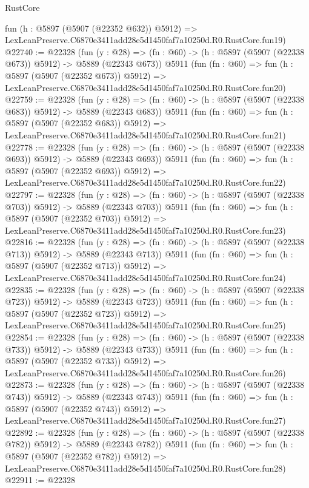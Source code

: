 \begin{lexlean}{RustCore}
\begin{coremodule}
    fun (h : @5897 (@5907 (@22352 @632)) @5912) =>
    LexLeanPreserve.C6870e3411add28e5d1450faf7a10250d.R0.RustCore.fun19)
@22740 := @22328
    (fun (y : @28) => (fn : @60) -> (h : @5897 (@5907 (@22338 @673)) @5912) -> @5889 (@22343 @673))
    @5911
    (fun (fn : @60) =>
    fun (h : @5897 (@5907 (@22352 @673)) @5912) =>
    LexLeanPreserve.C6870e3411add28e5d1450faf7a10250d.R0.RustCore.fun20)
@22759 := @22328
    (fun (y : @28) => (fn : @60) -> (h : @5897 (@5907 (@22338 @683)) @5912) -> @5889 (@22343 @683))
    @5911
    (fun (fn : @60) =>
    fun (h : @5897 (@5907 (@22352 @683)) @5912) =>
    LexLeanPreserve.C6870e3411add28e5d1450faf7a10250d.R0.RustCore.fun21)
@22778 := @22328
    (fun (y : @28) => (fn : @60) -> (h : @5897 (@5907 (@22338 @693)) @5912) -> @5889 (@22343 @693))
    @5911
    (fun (fn : @60) =>
    fun (h : @5897 (@5907 (@22352 @693)) @5912) =>
    LexLeanPreserve.C6870e3411add28e5d1450faf7a10250d.R0.RustCore.fun22)
@22797 := @22328
    (fun (y : @28) => (fn : @60) -> (h : @5897 (@5907 (@22338 @703)) @5912) -> @5889 (@22343 @703))
    @5911
    (fun (fn : @60) =>
    fun (h : @5897 (@5907 (@22352 @703)) @5912) =>
    LexLeanPreserve.C6870e3411add28e5d1450faf7a10250d.R0.RustCore.fun23)
@22816 := @22328
    (fun (y : @28) => (fn : @60) -> (h : @5897 (@5907 (@22338 @713)) @5912) -> @5889 (@22343 @713))
    @5911
    (fun (fn : @60) =>
    fun (h : @5897 (@5907 (@22352 @713)) @5912) =>
    LexLeanPreserve.C6870e3411add28e5d1450faf7a10250d.R0.RustCore.fun24)
@22835 := @22328
    (fun (y : @28) => (fn : @60) -> (h : @5897 (@5907 (@22338 @723)) @5912) -> @5889 (@22343 @723))
    @5911
    (fun (fn : @60) =>
    fun (h : @5897 (@5907 (@22352 @723)) @5912) =>
    LexLeanPreserve.C6870e3411add28e5d1450faf7a10250d.R0.RustCore.fun25)
@22854 := @22328
    (fun (y : @28) => (fn : @60) -> (h : @5897 (@5907 (@22338 @733)) @5912) -> @5889 (@22343 @733))
    @5911
    (fun (fn : @60) =>
    fun (h : @5897 (@5907 (@22352 @733)) @5912) =>
    LexLeanPreserve.C6870e3411add28e5d1450faf7a10250d.R0.RustCore.fun26)
@22873 := @22328
    (fun (y : @28) => (fn : @60) -> (h : @5897 (@5907 (@22338 @743)) @5912) -> @5889 (@22343 @743))
    @5911
    (fun (fn : @60) =>
    fun (h : @5897 (@5907 (@22352 @743)) @5912) =>
    LexLeanPreserve.C6870e3411add28e5d1450faf7a10250d.R0.RustCore.fun27)
@22892 := @22328
    (fun (y : @28) => (fn : @60) -> (h : @5897 (@5907 (@22338 @782)) @5912) -> @5889 (@22343 @782))
    @5911
    (fun (fn : @60) =>
    fun (h : @5897 (@5907 (@22352 @782)) @5912) =>
    LexLeanPreserve.C6870e3411add28e5d1450faf7a10250d.R0.RustCore.fun28)
@22911 := @22328

\end{coremodule}
\end{lexlean}
